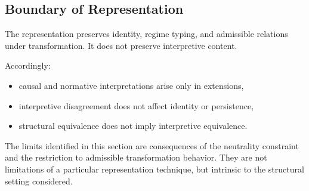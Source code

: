 \subsection{Boundary of Representation}
\label{subsec:limits_boundary_representation}

The representation preserves identity, regime typing,
and admissible relations under transformation.
It does not preserve interpretive content.

Accordingly:

\begin{itemize}
\item causal and normative interpretations arise only in extensions,
\item interpretive disagreement does not affect identity or persistence,
\item structural equivalence does not imply interpretive equivalence.
\end{itemize}


The limits identified in this section are consequences
of the neutrality constraint and the restriction
to admissible transformation behavior.
They are not limitations of a particular representation technique,
but intrinsic to the structural setting considered.

